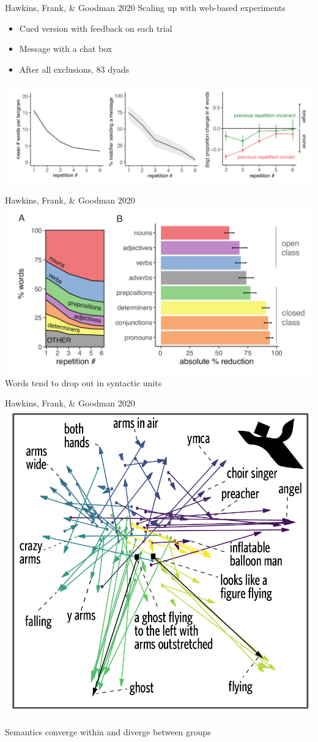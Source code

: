 \documentclass[ 12pt, xcolor=beamer,table,usenames,dvipsnames, ignorenonframetext, ngerman]{beamer}
\begin{document}
%
\begin{frame}{Hawkins, Frank, \& Goodman 2020}
Scaling up with web-based experiments
\begin{itemize}
	\item Cued version with feedback on each trial \pause
	\item Message with a chat box \pause
	\item After all exclusions, 83 dyads \pause
\end{itemize}
\includegraphics[width=\textwidth]{../images/hawkins_fewer_words.png}
\end{frame}
%
\begin{frame}{Hawkins, Frank, \& Goodman 2020}
\includegraphics[width=\textwidth]{../images/hawkins_pos.png}
Words tend to drop out in syntactic units
\end{frame}

\begin{frame}{Hawkins, Frank, \& Goodman 2020}
	\includegraphics[width=.6\textwidth]{../images/hawkins_semantics.png}
	
	Semantics converge within and diverge between groups
\end{frame}
\end{document}
